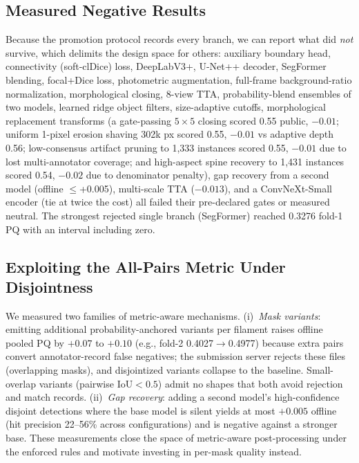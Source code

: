 \documentclass[conference]{IEEEtran}
\begin{document}
\subsection{Measured Negative Results}
Because the promotion protocol records every branch, we can report what did
\emph{not} survive, which delimits the design space for others:
auxiliary boundary head, connectivity (soft-clDice) loss, DeepLabV3+,
U-Net++ decoder, SegFormer blending, focal+Dice loss, photometric augmentation,
full-frame background-ratio normalization, morphological closing, 8-view TTA,
probability-blend ensembles of two models, learned ridge object filters, size-adaptive cutoffs, morphological replacement
transforms (a gate-passing $5\times 5$ closing scored 0.55 public, $-0.01$; uniform 1-pixel erosion shaving 302k px scored 0.55, $-0.01$ vs adaptive depth 0.56; low-consensus artifact pruning to 1,333 instances scored 0.55, $-0.01$ due to lost multi-annotator coverage; and high-aspect spine recovery to 1,431 instances scored 0.54, $-0.02$ due to denominator penalty), gap
recovery from a second model (offline $\le$+0.005), multi-scale TTA ($-0.013$),
and a ConvNeXt-Small encoder (tie at twice the cost) all failed their pre-declared
gates or measured neutral. The strongest rejected
single branch (SegFormer) reached 0.3276 fold-1 PQ with an interval including zero.

\subsection{Exploiting the All-Pairs Metric Under Disjointness}
We measured two families of metric-aware mechanisms. (i)~\emph{Mask variants}:
emitting additional probability-anchored variants per filament raises offline pooled
PQ by $+0.07$ to $+0.10$ (e.g., fold-2 0.4027$\to$0.4977) because extra pairs convert
annotator-record false negatives; the submission server rejects these files
(overlapping masks), and disjointized variants collapse to the baseline. Small-overlap
variants (pairwise $\mathrm{IoU}<0.5$) admit no shapes that both avoid rejection and
match records. (ii)~\emph{Gap recovery}: adding a second model's high-confidence
disjoint detections where the base model is silent yields at most $+0.005$ offline
(hit precision 22--56\% across configurations) and is negative against a stronger
base. These measurements close the space of metric-aware post-processing under the
enforced rules and motivate investing in per-mask quality instead.
\end{document}
